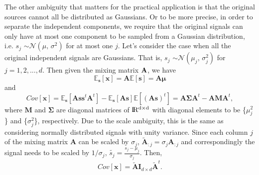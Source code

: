 \documentclass[aps,prl,preprint,superscriptaddress]{revtex4-2}
\begin{document}
The other ambiguity that matters for the practical application is that the original sources cannot all be distributed as Gaussians. Or to be more precise, in order to separate the independent components, we require that the original signals can only have at most one component to be sampled from a Gaussian distribution, i.e. $s_{j}$ $\sim \mathcal{N}(\mu,\,\sigma^{2})$ for at most one $j$. Let's consider the case when all the original independent signals are Gaussians. That is, $s_{j}$ $\sim \mathcal{N}(\mu_{j},\,\sigma_{j}^{2})$ for $j = 1, 2, ..., d$. Then given the mixing matrix $\bf{A}$, we have 
\begin{equation}
\mathbb{E}_{\mathbf{s}}[\mathbf{x}] = \mathbf{A}\mathbb{E}[\mathbf{s}] = \mathbf{A}\bm{\mu}
\end{equation}
and 
\begin{equation}
Cov[\mathbf{x}] = \mathbb{E}_{\mathbf{s}}[\mathbf{As}\mathbf{s}^t\mathbf{A}^{t}]-\mathbb{E}_{\mathbf{s}}[\mathbf{As}]\mathbb{E}[(\mathbf{As})^{t}] =  \mathbf{A}\bm{\Sigma}\mathbf{A}^{t}-\mathbf{A}\mathbf{M}\mathbf{A}^{t},
\end{equation} where $\mathbf{M}$ and $\bm{\Sigma}$ are diagonal matrices of $\rm I\!R^{d\times d}$ with diagonal elements to be \{$\mu_{j}^{2}$\} and \{$\sigma_{j}^{2}$\}, respectively. Due to the scale ambiguity, this is the same as considering normally distributed signals with unity variance. Since each column $j$ of the mixing matrix $\mathbf{A}$ can be scaled by $\sigma_{j}$, $\tilde{\mathbf{A}}_{:j} = \sigma_{j}\mathbf{A}_{:j}$ and correspondingly the signal needs to be scaled by $1/\sigma_{j}$, $\tilde{s_{j}} = \frac{s_{j}-\mu_{j}}{\sigma_{j}}$. Then, 
\begin{equation}
Cov[\mathbf{x}] = \tilde{\mathbf{A}}\mathbf{I}_{d\times d}\tilde{\mathbf{A}}^{t}.
\end{equation}
\end{document}
